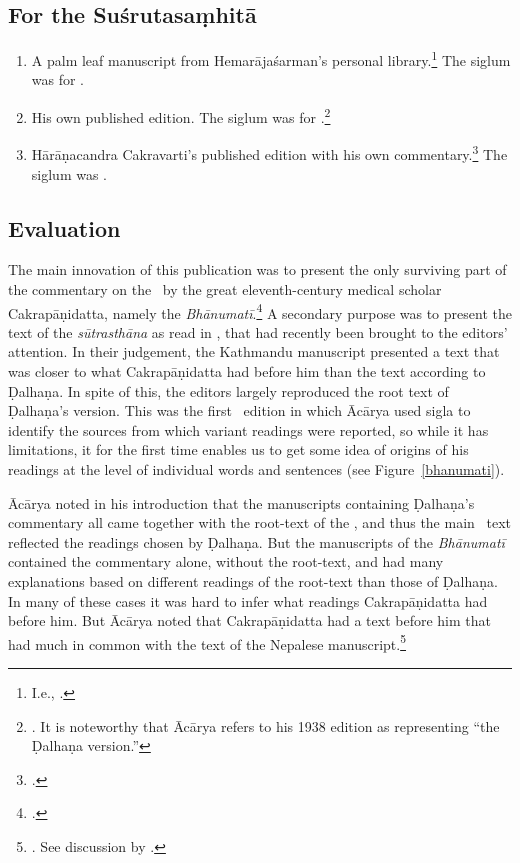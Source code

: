 \subsection{For the Suśrutasaṃhitā}

\begin{enumerate}
    \item A palm leaf manuscript from Hemarājaśarman's personal
    library.\footnote{I.e., .}  The siglum was
     for .
    
    \item His own published edition. The siglum was  for 
    .\footnote{\cite{vulgate}.  It is noteworthy that Ācārya refers to
    his 1938 edition as representing “the Ḍalhaṇa version.”\label{dalhanaversion}}
    
    \item Hārāṇacandra Cakravarti's published edition with his own
    commentary.\footcite{bhat-1917} The siglum was .
\end{enumerate}
%
\subsection{Evaluation}

The main innovation of this publication was to present the only surviving part
of the commentary on the \SS\ by the great eleventh-century medical scholar
Cakrapāṇidatta, namely the \emph{Bhānumatī}.\footcite[IA, 374--375 and IB,
495--496]{meul-hist} A secondary purpose was to present the text of the
\emph{sūtrasthāna} as read in , that had recently
been brought to the editors' attention. In their judgement, the Kathmandu
manuscript presented a text that was closer to what Cakrapāṇidatta had before
him than the text according to Ḍalhaṇa.  In spite of this, the editors largely
reproduced the root text of Ḍalhaṇa's version. This was the first \SS\ edition
in which Ācārya used sigla to identify the sources from which variant readings
were reported, so while it has limitations, it for the first time enables us
to get some idea of origins of his readings at the level of individual words and 
sentences (see Figure~\ref{bhanumati}).

\label{ref:dalhana}Ācārya noted in his introduction that the manuscripts
containing  Ḍalhaṇa's commentary all came together with the root-text of the \SS,
and thus the main \SS\ text reflected the readings chosen by Ḍalhaṇa.  But the
manuscripts of the \emph{Bhānumatī} contained the commentary alone, without the
root-text, and had many explanations based on different readings of the root-text
than those of Ḍalhaṇa.  In many of these cases it was hard to infer what readings
Cakrapāṇidatta had before him. But Ācārya noted that Cakrapāṇidatta had a text
before him that had much in common with the text of the Nepalese
manuscript.\footnote{\cite[3--4]{acar-1939}.  See discussion by
    \citet[7]{kleb-2021a}.}

